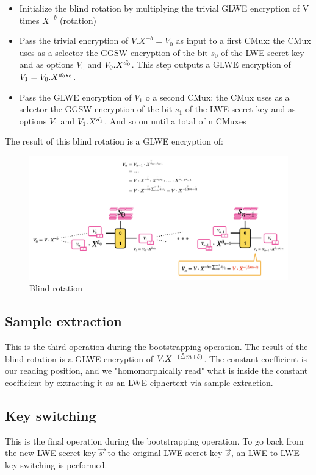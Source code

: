 \documentclass{techrep}
\theoremstyle{definition}
\theoremstyle{plain}
\begin{document}
\begin{itemize}
  \item Initialize the blind rotation by multiplying the trivial GLWE encryption of V times $X^{-b}$ (rotation)
  \item Pass the trivial encryption of $V.X^{-b} =V_0$ as input to a first CMux: the CMux uses as a selector the GGSW encryption of the bit $s_0$ of the LWE secret key and as options $V_0$ and $V_0.X^{\Tilde{a_0}}$. This step outputs a GLWE encryption of $V_1 = V_0.X^{\Tilde{a_0}s_0}$.
  \item Pass the GLWE encryption of $V_1$ o a second CMux: the CMux uses as a selector the GGSW encryption of the bit $s_1$ of the LWE secret key and as options $V_1$ and $V_1.X^{\Tilde{a_1}}$. And so on until a total of n CMuxes
\end{itemize}

The result of this blind rotation is a GLWE encryption of:
	\begin{figure}[H]
		\centering
	\includegraphics[width=1.1\columnwidth]{fig/blind_1.png}
		\caption{Blind rotation}
		\label{fig:blind_1}
	\end{figure}

\subsection{Sample extraction}
This is the third operation during the bootstrapping operation. The result of the blind rotation is a GLWE encryption of $V.X^{-(\Tilde{\bigtriangleup}m+\Tilde{e})}$. The constant coefficient is our reading position, and we "homomorphically read" what is inside the constant coefficient by extracting it as an LWE ciphertext via sample extraction. 
\subsection{Key switching}
This is the final operation during the bootstrapping operation.
To go back from the new LWE secret key $\overrightarrow{s^,}$ to the original LWE secret key $\overrightarrow{s}$, an LWE-to-LWE key switching is performed.
\end{document}
